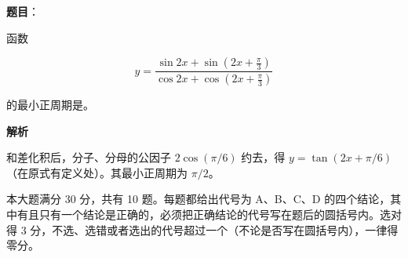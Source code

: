 \begin{answer}

\textbf{题目}：

函数

\nopagebreak[4]
\[
y=\frac{\sin 2x+\sin\left(2x+\frac\pi3\right)}{\cos 2x+\cos\left(2x+\frac\pi3\right)}
\]

的最小正周期是\gkblank{}。

\textbf{解析}

和差化积后，分子、分母的公因子 $2\cos(\pi/6)$ 约去，得 $y=\tan(2x+\pi/6)$（在原式有定义处）。其最小正周期为 $\pi/2$。


\end{answer}

本大题满分 30 分，共有 10 题。每题都给出代号为 A、B、C、D 的四个结论，其中有且只有一个结论是正确的，必须把正确结论的代号写在题后的圆括号内。选对得 3 分，不选、选错或者选出的代号超过一个（不论是否写在圆括号内），一律得零分。

